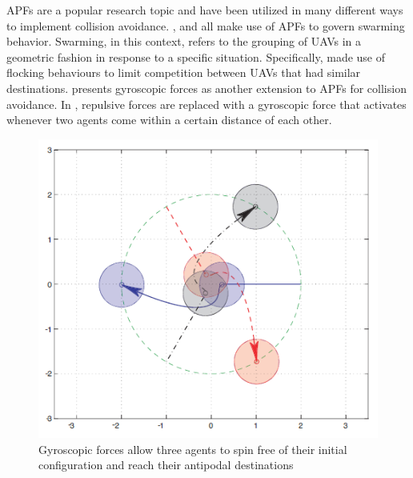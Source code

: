 \documentclass[conference]{IEEEtran}
\begin{document}
APFs are a popular research topic and have been utilized in many different ways to implement collision avoidance.   \cite{ruchti2011uav}, \cite{balch2000social} and \cite{barnes2006swarm} all make use of APFs to govern swarming behavior.  Swarming, in this context, refers to the grouping of UAVs in a geometric fashion in response to a specific situation. Specifically,  \cite{ruchti2011uav} made use of flocking behaviours to limit competition between UAVs that had similar destinations.  \cite{chang2003collision} presents gyroscopic forces as another extension to APFs for collision avoidance.  In \cite{chang2003collision}, repulsive forces are replaced with a gyroscopic force that activates whenever two agents come within a certain distance of each other.

\begin{figure}
	\includegraphics [width=1\columnwidth] {2003Chang}
	\caption{Gyroscopic forces allow three agents to spin free of their initial configuration and reach their antipodal destinations \cite{chang2003collision}}
	\label{fig:2003Chang}
\end{figure}
\end{document}
